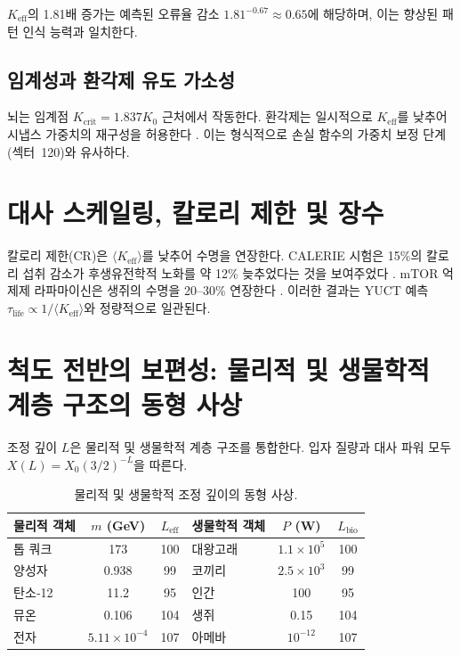 \documentclass[11pt,a4paper]{article}
\begin{document}
	\(K_{\text{eff}}\)의 1.81배 증가는 예측된 오류율 감소 \(1.81^{-0.67} \approx 0.65\)에 해당하며, 이는 향상된 패턴 인식 능력과 일치한다.
	
	\subsection{임계성과 환각제 유도 가소성}
	
	뇌는 임계점 \(K_{\mathrm{crit}} = 1.837 K_0\) 근처에서 작동한다. 환각제는 일시적으로 \(K_{\text{eff}}\)를 낮추어 시냅스 가중치의 재구성을 허용한다 \cite{CarhartHarris2018, CarhartHarris2023}. 이는 형식적으로 손실 함수의 가중치 보정 단계(섹터~120)와 유사하다.
	
	\section{대사 스케일링, 칼로리 제한 및 장수}
	\label{sec:metabolism}
	
	칼로리 제한(CR)은 \(\langle K_{\text{eff}} \rangle\)를 낮추어 수명을 연장한다. CALERIE 시험은 15\%의 칼로리 섭취 감소가 후생유전학적 노화를 약 12\% 늦추었다는 것을 보여주었다 \cite{CALERIE2018}. mTOR 억제제 라파마이신은 생쥐의 수명을 20--30\% 연장한다 \cite{Miller2022}. 이러한 결과는 YUCT 예측 \(\tau_{\text{life}} \propto 1/\langle K_{\text{eff}} \rangle\)와 정량적으로 일관된다.
	
	\section{척도 전반의 보편성: 물리적 및 생물학적 계층 구조의 동형 사상}
	\label{sec:isomorphism}
	
	조정 깊이 \(L\)은 물리적 및 생물학적 계층 구조를 통합한다. 입자 질량과 대사 파워 모두 \(X(L) = X_0 (3/2)^{-L}\)을 따른다.
	
	\begin{table}[H]
		\centering
		\caption{물리적 및 생물학적 조정 깊이의 동형 사상.}
		\label{tab:isomorphism}
		\begin{tabular}{l c c l c c}
			\toprule
			\textbf{물리적 객체} & \(m\) (GeV) & \(L_{\mathrm{eff}}\) & \textbf{생물학적 객체} & \(P\) (W) & \(L_{\mathrm{bio}}\) \\
			\midrule
			톱 쿼크 & 173 & 100 & 대왕고래 & \(1.1\times10^5\) & 100 \\
			양성자 & 0.938 & 99 & 코끼리 & \(2.5\times10^3\) & 99 \\
			탄소‑12 & 11.2 & 95 & 인간 & 100 & 95 \\
			뮤온 & 0.106 & 104 & 생쥐 & 0.15 & 104 \\
			전자 & \(5.11\times10^{-4}\) & 107 & 아메바 & \(10^{-12}\) & 107 \\
			\bottomrule
		\end{tabular}
	\end{table}
	
\end{document}

